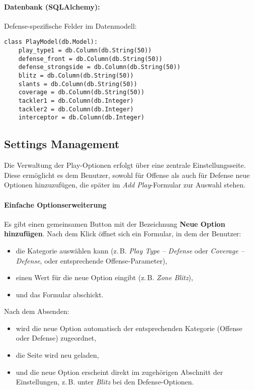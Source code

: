 \documentclass[12pt]{article}
\begin{document}
\paragraph{Datenbank (SQLAlchemy):} Defense-spezifische Felder im Datenmodell:

\begin{verbatim}
class PlayModel(db.Model):
    play_type1 = db.Column(db.String(50))
    defense_front = db.Column(db.String(50))
    defense_strongside = db.Column(db.String(50))
    blitz = db.Column(db.String(50))
    slants = db.Column(db.String(50))
    coverage = db.Column(db.String(50))
    tackler1 = db.Column(db.Integer)
    tackler2 = db.Column(db.Integer)
    interceptor = db.Column(db.Integer)
\end{verbatim}

\subsection{ Settings Management}

Die Verwaltung der Play-Optionen erfolgt über eine zentrale Einstellungsseite. Diese ermöglicht es dem Benutzer, sowohl für Offense als auch für Defense neue Optionen hinzuzufügen, die später im \textit{Add Play}-Formular zur Auswahl stehen.

\paragraph{Einfache Optionserweiterung}%
Es gibt einen gemeinsamen Button mit der Bezeichnung \textbf{Neue Option hinzufügen}. Nach dem Klick öffnet sich ein Formular, in dem der Benutzer:
\begin{itemize}
  \item die Kategorie auswählen kann (z.\,B. \textit{Play Type – Defense} oder \textit{Coverage – Defense}, oder entsprechende Offense-Parameter),
  \item einen Wert für die neue Option eingibt (z.\,B. \textit{Zone Blitz}),
  \item und das Formular abschickt.
\end{itemize}

Nach dem Absenden:
\begin{itemize}
  \item wird die neue Option automatisch der entsprechenden Kategorie (Offense oder Defense) zugeordnet,
  \item die Seite wird neu geladen,
  \item und die neue Option erscheint direkt im zugehörigen Abschnitt der Einstellungen, z.\,B. unter \textit{Blitz} bei den Defense-Optionen.
\end{itemize}
\end{document}
